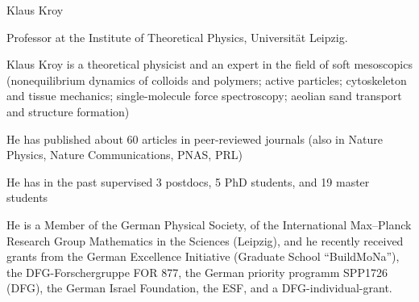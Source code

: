 \begin{participant}[type=leadPI,PM=12,gender=male,salary=5500]{Klaus Kroy}

Professor at the Institute of Theoretical Physics, Universität Leipzig.

Klaus Kroy is a theoretical physicist and an expert in the field of
soft mesoscopics (nonequilibrium dynamics of colloids and polymers; active particles; cytoskeleton and tissue mechanics; single-molecule force spectroscopy; aeolian sand transport and structure formation)

He has published about 60 articles in peer-reviewed journals (also in
Nature Physics, Nature Communications, PNAS, PRL) 

He has in the past supervised 3 postdocs, 5 PhD students, and 19
master students 

He is a Member of the German Physical Society, of the International Max--Planck Research Group
Mathematics in the Sciences (Leipzig), and he recently received grants from
the German Excellence Initiative (Graduate School ``BuildMoNa''),
the DFG-Forschergruppe FOR 877, the German
priority programm SPP1726 (DFG), the German Israel
Foundation, the ESF, and a DFG-individual-grant.


\end{participant}
